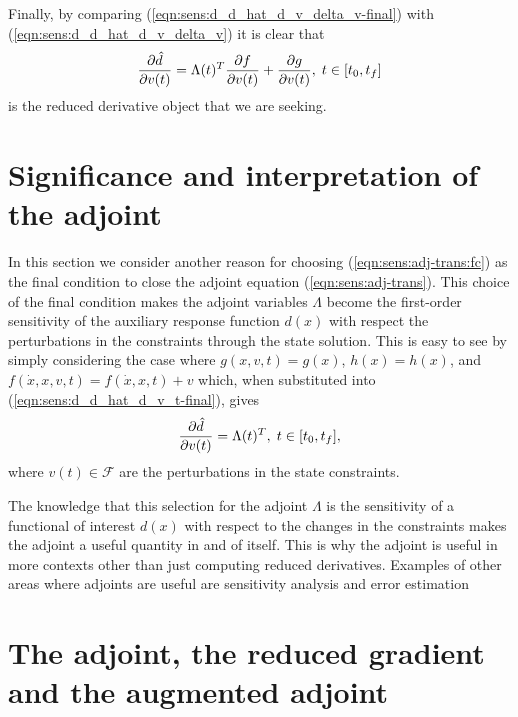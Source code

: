 \documentclass[pdf,ps2pdf,11pt]{SANDreport}
\begin{document}
Finally, by comparing (\ref{eqn:sens:d_d_hat_d_v_delta_v-final})
with (\ref{eqn:sens:d_d_hat_d_v_delta_v}) it is clear that
%
\begin{equation}
\displaystyle{\frac{\partial \hat{d}}{\partial v(t)}} = \Lambda(t)^T \displaystyle{\frac{\partial f}{\partial v(t)}} + \displaystyle{\frac{\partial g}{\partial v(t)}}, \; t\in[t_0,t_f]
\label{eqn:sens:d_d_hat_d_v_t-final}
\end{equation}
%
is the reduced derivative object that we are seeking.

\section{Significance and interpretation of the adjoint}

In this section we consider another reason for choosing
(\ref{eqn:sens:adj-trans:fc}) as the final condition to close the
adjoint equation (\ref{eqn:sens:adj-trans}).  This choice of the
final condition makes the adjoint variables $\Lambda$ become the first-order
sensitivity of the auxiliary response function $d(x)$ with respect the
perturbations in the constraints through the state solution.  This is easy to
see by simply considering the case where $g(x,v,t) = g(x)$, $h(x) = h(x)$, and
$f(\dot{x},x,v,t) = f(\dot{x},x,t) + v$ which, when substituted into
(\ref{eqn:sens:d_d_hat_d_v_t-final}), gives
%
\begin{equation}
\displaystyle{\frac{\partial \hat{d}}{\partial v(t)}} = \Lambda(t)^T , \; t\in[t_0,t_f],
\label{eqn:sens:adjoint_interpretation}
\end{equation}
%
where $v(t)\in\mathcal{F}$ are the perturbations in the state constraints.

The knowledge that this selection for the adjoint $\Lambda$ is the sensitivity
of a functional of interest $d(x)$ with respect to the changes in the
constraints makes the adjoint a useful quantity in and of itself.  This is why
the adjoint is useful in more contexts other than just computing reduced
derivatives.  Examples of other areas where adjoints are useful are
sensitivity analysis and error estimation
{}\cite{SensitivityTechnologiesSandReport}


%
\section{The adjoint, the reduced gradient and the augmented adjoint}
%
\end{document}
